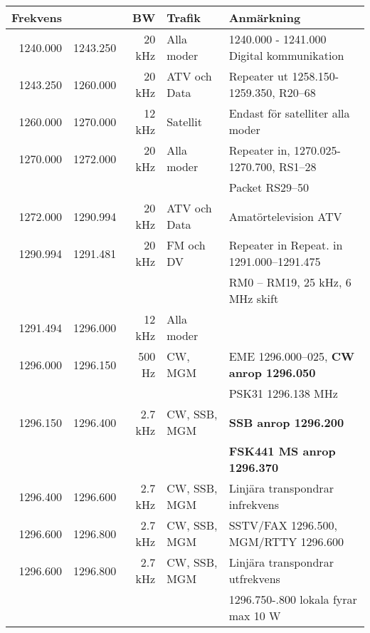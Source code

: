 \begin{tabular}{rrrll}
	\textbf{Frekvens} &          & \textbf{BW} & \textbf{Trafik} & \textbf{Anmärkning}                           \\ \hline

1240.000 & 1243.250 & 20 kHz  & Alla moder   & 1240.000 - 1241.000 Digital kommunikation     \\ \hline
1243.250 & 1260.000 & 20 kHz  & ATV och Data & Repeater ut 1258.150-1259.350, R20--68        \\ \hline
1260.000 & 1270.000 & 12 kHz  & Satellit     & Endast för satelliter alla moder              \\ \hline
1270.000 & 1272.000 & 20 kHz  & Alla moder   & Repeater in, 1270.025-1270.700, RS1--28       \\
         &          &         &              & Packet RS29--50                               \\ \hline
1272.000 & 1290.994 & 20 kHz  & ATV och Data & Amatörtelevision ATV                          \\ \hline
1290.994 & 1291.481 & 20 kHz  & FM och DV    & Repeater in Repeat. in 1291.000--1291.475     \\
         &          &         &              & RM0 – RM19, 25 kHz, 6 MHz skift               \\ \hline
1291.494 & 1296.000 & 12 kHz  & Alla moder   &                                               \\ \hline
1296.000 & 1296.150 & 500 Hz  & CW,  MGM     & EME 1296.000--025, \textbf{CW anrop 1296.050} \\
         &          &         &              & PSK31 1296.138 MHz                            \\ \hline
1296.150 & 1296.400 & 2.7 kHz & CW, SSB, MGM & \textbf{SSB anrop 1296.200}                   \\
         &          &         &              & \textbf{FSK441 MS anrop 1296.370}             \\ \hline
1296.400 & 1296.600 & 2.7 kHz & CW, SSB, MGM & Linjära transpondrar infrekvens               \\ \hline
1296.600 & 1296.800 & 2.7 kHz & CW, SSB, MGM & SSTV/FAX 1296.500, MGM/RTTY 1296.600          \\ \hline
1296.600 & 1296.800 & 2.7 kHz & CW, SSB, MGM & Linjära transpondrar utfrekvens               \\
         &          &         &              & 1296.750-.800 lokala fyrar max 10 W           \\ \hline

\end{tabular}
